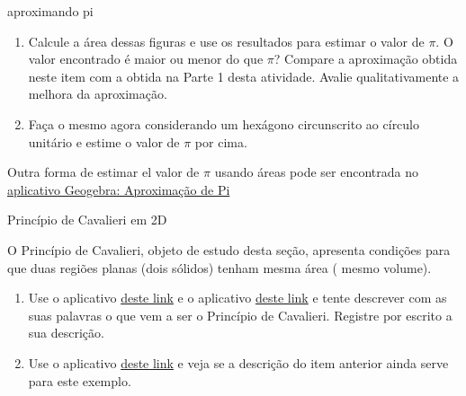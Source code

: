 \begin{task}{aproximando pi}
\begin{enumerate}
\begin{figure}[H]
\begin{tikzpicture} [scale=3.5, every path/.style={very thick}]
\end{tikzpicture}

\end{figure}

\item {} 
Calcule a área dessas figuras e use os resultados para estimar o valor de \(\pi\). O valor encontrado é maior ou menor do que \(\pi\)? Compare a aproximação obtida neste item com a obtida na Parte 1 desta atividade. Avalie qualitativamente a melhora da aproximação.

\item {} 
Faça o mesmo agora considerando um hexágono circunscrito ao círculo unitário e estime o valor de \(\pi\) por cima.

\end{enumerate}

Outra forma de estimar el valor de \(\pi\) usando áreas pode ser encontrada no \href{https://www.geogebra.org/m/v2aqzkce}{aplicativo Geogebra: Aproximação de Pi}
\end{task}


\label{\detokenize{GE504-8:explorando-principio-de-cavalieri}}\label{\detokenize{GE504-8::doc}}
\begin{task}{Princípio de Cavalieri em 2D}



O Princípio de Cavalieri, objeto de estudo desta seção, apresenta condições para que duas regiões planas (dois sólidos) tenham mesma área ( mesmo volume).
\begin{enumerate}
\item {} 
Use o aplicativo \href{https://ggbm.at/bxrxatwv}{deste link} e o aplicativo \href{https://ggbm.at/gkh7g4y5}{deste link} e tente descrever com as suas palavras o que vem a ser o Princípio de Cavalieri. Registre por escrito a sua descrição.

\item {} 
Use o aplicativo \href{https://ggbm.at/rqpdcc33}{deste link} e veja se a descrição do item anterior ainda serve para este exemplo.

\end{enumerate}
\end{task}

